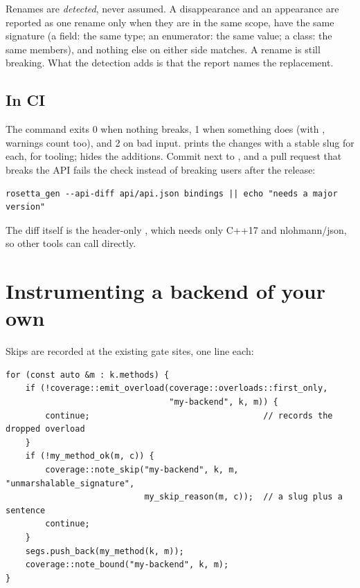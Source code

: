 \begin{note}
Renames are \emph{detected}, never assumed. A disappearance and an appearance
are reported as one rename only when they are in the same scope, have the same
signature (a field: the same type; an enumerator: the same value; a class: the
same members), and nothing else on either side matches. A rename is still
breaking. What the detection adds is that the report names the replacement.
\end{note}

\subsection{In CI}

The command exits 0 when nothing breaks, 1 when something does (with
, warnings count too), and 2 on bad input.  prints
the changes with a stable  slug for each, for tooling;
 hides the additions. Commit  next to
, and a pull request that breaks the API fails the check
instead of breaking users after the release:

\begin{lstlisting}[style=sh]
rosetta_gen --api-diff api/api.json bindings || echo "needs a major version"
\end{lstlisting}

The diff itself is the header-only , which needs
only C++17 and nlohmann/json, so other tools can call
 directly.

\section{Instrumenting a backend of your own}

Skips are recorded at the existing gate sites, one line each:

\begin{lstlisting}[style=cpp]
for (const auto &m : k.methods) {
    if (!coverage::emit_overload(coverage::overloads::first_only,
                                 "my-backend", k, m)) {
        continue;                                   // records the dropped overload
    }
    if (!my_method_ok(m, c)) {
        coverage::note_skip("my-backend", k, m, "unmarshalable_signature",
                            my_skip_reason(m, c));  // a slug plus a sentence
        continue;
    }
    segs.push_back(my_method(k, m));
    coverage::note_bound("my-backend", k, m);
}
\end{lstlisting}

